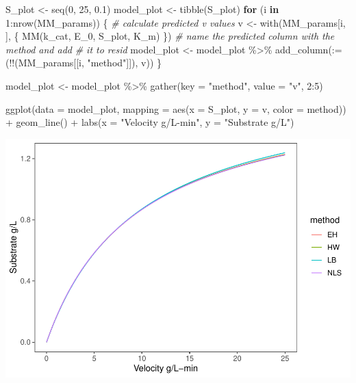 \documentclass[
]{article}
\newenvironment{Shaded}{\begin{snugshade}}{\end{snugshade}}
\newcommand{\AttributeTok}[1]{\textcolor[rgb]{0.77,0.63,0.00}{#1}}
\newcommand{\CommentTok}[1]{\textcolor[rgb]{0.56,0.35,0.01}{\textit{#1}}}
\newcommand{\ControlFlowTok}[1]{\textcolor[rgb]{0.13,0.29,0.53}{\textbf{#1}}}
\newcommand{\DecValTok}[1]{\textcolor[rgb]{0.00,0.00,0.81}{#1}}
\newcommand{\FloatTok}[1]{\textcolor[rgb]{0.00,0.00,0.81}{#1}}
\newcommand{\FunctionTok}[1]{\textcolor[rgb]{0.00,0.00,0.00}{#1}}
\newcommand{\NormalTok}[1]{#1}
\newcommand{\OtherTok}[1]{\textcolor[rgb]{0.56,0.35,0.01}{#1}}
\newcommand{\SpecialCharTok}[1]{\textcolor[rgb]{0.00,0.00,0.00}{#1}}
\newcommand{\StringTok}[1]{\textcolor[rgb]{0.31,0.60,0.02}{#1}}
\begin{document}
\begin{Shaded}
\begin{Highlighting}[]
\NormalTok{S\_plot }\OtherTok{\textless{}{-}} \FunctionTok{seq}\NormalTok{(}\DecValTok{0}\NormalTok{, }\DecValTok{25}\NormalTok{, }\FloatTok{0.1}\NormalTok{)}
\NormalTok{model\_plot }\OtherTok{\textless{}{-}} \FunctionTok{tibble}\NormalTok{(S\_plot)}
\ControlFlowTok{for}\NormalTok{ (i }\ControlFlowTok{in} \DecValTok{1}\SpecialCharTok{:}\FunctionTok{nrow}\NormalTok{(MM\_params)) \{}
    \CommentTok{\# calculate predicted v values}
\NormalTok{    v }\OtherTok{\textless{}{-}} \FunctionTok{with}\NormalTok{(MM\_params[i, ], \{}
        \FunctionTok{MM}\NormalTok{(k\_cat, E\_0, S\_plot, K\_m)}
\NormalTok{    \})}
    \CommentTok{\# name the predicted column with the method and add}
    \CommentTok{\# it to resid}
\NormalTok{    model\_plot }\OtherTok{\textless{}{-}}\NormalTok{ model\_plot }\SpecialCharTok{\%\textgreater{}\%} \FunctionTok{add\_column}\NormalTok{(}\StringTok{\textasciigrave{}}\AttributeTok{:=}\StringTok{\textasciigrave{}}\NormalTok{(}\SpecialCharTok{!!}\NormalTok{(MM\_params[[i, }
        \StringTok{"method"}\NormalTok{]]), v))}
\NormalTok{\}}

\NormalTok{model\_plot }\OtherTok{\textless{}{-}}\NormalTok{ model\_plot }\SpecialCharTok{\%\textgreater{}\%} \FunctionTok{gather}\NormalTok{(}\AttributeTok{key =} \StringTok{"method"}\NormalTok{, }
    \AttributeTok{value =} \StringTok{"v"}\NormalTok{, }\DecValTok{2}\SpecialCharTok{:}\DecValTok{5}\NormalTok{)}

\FunctionTok{ggplot}\NormalTok{(}\AttributeTok{data =}\NormalTok{ model\_plot, }\AttributeTok{mapping =} \FunctionTok{aes}\NormalTok{(}\AttributeTok{x =}\NormalTok{ S\_plot, }
    \AttributeTok{y =}\NormalTok{ v, }\AttributeTok{color =}\NormalTok{ method)) }\SpecialCharTok{+} \FunctionTok{geom\_line}\NormalTok{() }\SpecialCharTok{+} \FunctionTok{labs}\NormalTok{(}\AttributeTok{x =} \StringTok{"Velocity g/L{-}min"}\NormalTok{, }
    \AttributeTok{y =} \StringTok{"Substrate g/L"}\NormalTok{)}
\end{Highlighting}
\end{Shaded}

\includegraphics{Bioprocess_Engineering_files/figure-latex/unnamed-chunk-40-1.pdf}
\end{document}
